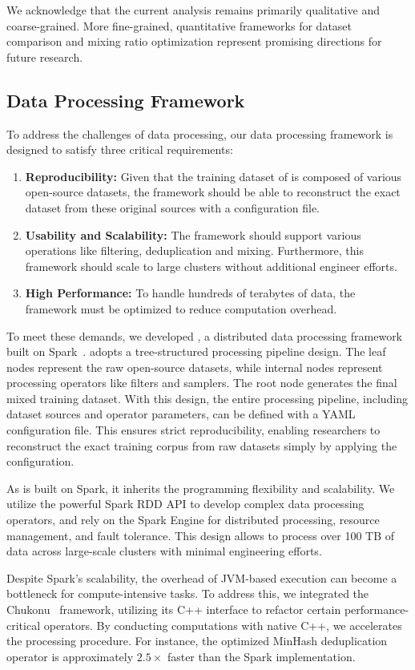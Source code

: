 We acknowledge that the current analysis remains primarily qualitative and coarse-grained. More fine-grained, quantitative frameworks for dataset comparison and mixing ratio optimization represent promising directions for future research.

\subsection{Data Processing Framework}
\label{sec:data_preprocessing_framework}

To address the challenges of data processing, our data processing framework is designed to satisfy three critical requirements:
\begin{enumerate}
    \item \textbf{Reproducibility:} Given that the training dataset of \sys is composed of various open-source datasets, the framework should be able to reconstruct the exact dataset from these original sources with a configuration file.
    \item \textbf{Usability and Scalability:} The framework should support various operations like filtering, deduplication and mixing. Furthermore, this framework should scale to large clusters without additional engineer efforts.
    \item \textbf{High Performance:} To handle hundreds of terabytes of data, the framework must be optimized to reduce computation overhead.
\end{enumerate}

To meet these demands, we developed \textbf{\dataframework}, a distributed data processing framework built on Spark~\cite{zaharia2012spark}.
\dataframework adopts a tree-structured processing pipeline design.
The leaf nodes represent the raw open-source datasets, while internal nodes represent processing operators like filters and samplers.
The root node generates the final mixed training dataset.
With this design, the entire processing pipeline, including dataset sources and operator parameters, can be defined with a YAML configuration file.
This ensures strict reproducibility, enabling researchers to reconstruct the exact training corpus from raw datasets simply by applying the configuration.

As \dataframework is built on Spark, it inherits the programming flexibility and scalability.
We utilize the powerful Spark RDD API to develop complex data processing operators, and rely on the Spark Engine for distributed processing, resource management, and fault tolerance.
This design allows \dataframework to process over 100 TB of data across large-scale clusters with minimal engineering efforts.

Despite Spark's scalability, the overhead of JVM-based execution can become a bottleneck for compute-intensive tasks. To address this, we integrated the Chukonu~\cite{chukonu} framework, utilizing its C++ interface to refactor certain performance-critical operators.
By conducting computations with native C++, we accelerates the processing procedure.
For instance, the optimized MinHash deduplication operator is approximately $2.5\times$ faster than the Spark implementation.





